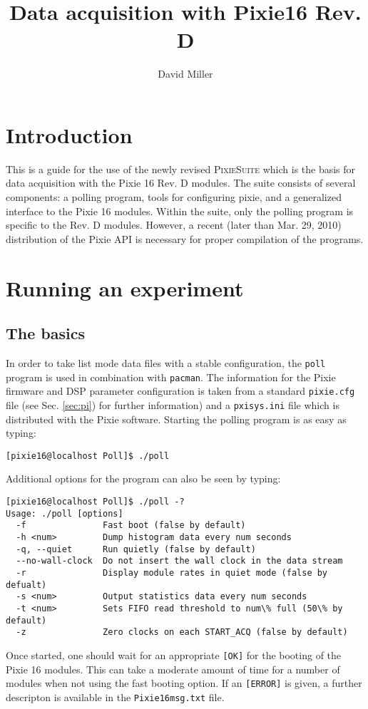\documentclass[10pt]{article}
\title{Data acquisition with Pixie16 Rev. D}
\author{David Miller}
\newcommand{\okay}{\texttt{[OK]}}
\newcommand{\error}{\texttt{[ERROR]}}
\begin{document}
\maketitle
\setcounter{tocdepth}{1}
\setlength{\LTcapwidth}{\textwidth}
\tableofcontents
\section{Introduction}
This is a guide for the use of the newly revised \textsc{PixieSuite} which is the basis for data acquisition with the Pixie 16 Rev. D modules. The suite consists of several components: a polling program, tools for configuring pixie, and a generalized interface to the Pixie 16 modules. Within the suite, only the polling program is specific to the Rev. D modules. However, a recent (later than Mar. 29, 2010) distribution of the Pixie API is necessary for proper compilation of the programs.
\section{Running an experiment}
\subsection{The basics}
In order to take list mode data files with a stable configuration, the \texttt{poll} program is used in combination with \texttt{pacman}. The information for the Pixie firmware and DSP parameter configuration is taken from a standard \texttt{pixie.cfg} file (see Sec. \ref{sec:pi}) for further information) and a \texttt{pxisys.ini} file which is distributed with the Pixie software. Starting the polling program is as easy as typing:
\begin{verbatim}
[pixie16@localhost Poll]$ ./poll
\end{verbatim}
Additional options for the program can also be seen by typing:
\begin{verbatim}
[pixie16@localhost Poll]$ ./poll -?
Usage: ./poll [options]
  -f               Fast boot (false by default)
  -h <num>         Dump histogram data every num seconds
  -q, --quiet      Run quietly (false by default)
  --no-wall-clock  Do not insert the wall clock in the data stream
  -r               Display module rates in quiet mode (false by defualt)
  -s <num>         Output statistics data every num seconds
  -t <num>         Sets FIFO read threshold to num\% full (50\% by default)
  -z               Zero clocks on each START_ACQ (false by default)
\end{verbatim}
Once started, one should wait for an appropriate \okay{} for the booting of the Pixie 16 modules. This can take a moderate amount of time for a number of modules when not using the fast booting option. If an \error{} is given, a further descripton is available in the \texttt{Pixie16msg.txt} file.
\end{document}
